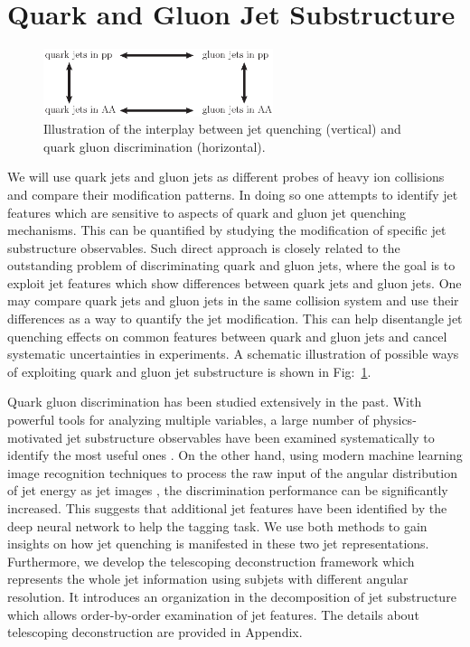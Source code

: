\documentclass[notoc]{JHEP3}
\begin{document}
\section{Quark and Gluon Jet Substructure}
\label{sec:qg}
\begin{figure}
	   \centering
	   \includegraphics[width=0.6\textwidth]{plots/qg_HI}
	   \caption{Illustration of the interplay between jet quenching (vertical) and quark gluon discrimination (horizontal). }
	   \label{fig:quenching_discrimination}
\end{figure}

We will use quark jets and gluon jets as different probes of heavy ion collisions and compare their modification patterns. In doing so one attempts to identify jet features which are sensitive to aspects of quark and gluon jet quenching mechanisms. This can be quantified by studying the modification of specific jet substructure observables. Such direct approach is closely related to the outstanding problem of discriminating quark and gluon jets, where the goal is to exploit jet features which show differences between quark jets and gluon jets. One may compare quark jets and gluon jets in the same collision system and use their differences as a way to quantify the jet modification. This can help disentangle jet quenching effects on common features between quark and gluon jets and cancel systematic uncertainties in experiments. A schematic illustration of possible ways of exploiting quark and gluon jet substructure is shown in Fig:~\ref{fig:quenching_discrimination}.

Quark gluon discrimination has been studied extensively in the past\cite{}. With powerful tools for analyzing multiple variables, a large number of physics-motivated jet substructure observables have been examined systematically to identify the most useful ones \cite{Gallicchio:2011xq,Gallicchio:2012ez}. On the other hand, using modern machine learning image recognition techniques to process the raw input of the angular distribution of jet energy as jet images \cite{Komiske:2016rsd}, the discrimination performance can be significantly increased. This suggests that additional jet features have been identified by the deep neural network to help the tagging task. We use both methods to gain insights on how jet quenching is manifested in these two jet representations. Furthermore, we develop the telescoping deconstruction framework which represents the whole jet information using subjets with different angular resolution. It introduces an organization in the decomposition of jet substructure which allows order-by-order examination of jet features. The details about telescoping deconstruction are provided in Appendix.
\end{document}
